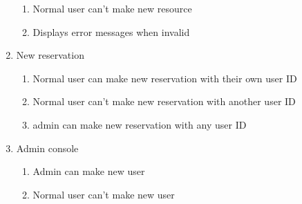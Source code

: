 \documentclass[12pt]{article}
\begin{document}
\begin{enumerate}
\begin{enumerate}
		\item Normal user can't make new resource
		\item Displays error messages when invalid
	\end{enumerate}
	\item New reservation
	\begin{enumerate}
		\item Normal user can make new reservation with their own user ID
		\item Normal user can't make new reservation with another user ID
		\item admin can make new reservation with any user ID
	\end{enumerate}
	\item Admin console
	\begin{enumerate}
		\item Admin can make new user
		\item Normal user can't make new user
	\end{enumerate}
\end{enumerate}

\clearpage
\end{document}
